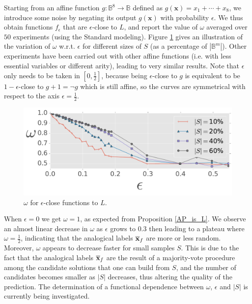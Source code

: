 Starting from an affine function $g \colon \mathbb{B}^8 \to \mathbb{B}$ defined
as  $g(\mathbf{x}) = x_1 + \cdots + x_8$, we introduce some noise by negating
its output $g(\mathbf{x})$ with probability $\epsilon$. We thus obtain
functions $f_{\epsilon}$ that are $\epsilon$-close to $L$, and report the value
of $\omega$ averaged over $50$ experiments (using the Standard modeling).
Figure \ref{omega_vs_eps} gives an illustration of the variation of $\omega$
w.r.t.  $\epsilon$ for different sizes of $S$ (as a percentage of
$|\mathbb{B}^m|$).  Other experiments have been carried out with other affine
functions (i.e.  with less essential variables or different arity), leading to
very similar results.  Note that $\epsilon$ only needs to be taken in $[0,
\frac{1}{2}]$, because being $\epsilon$-close to $g$ is equivalent to be $1 -
\epsilon$-close to $g + 1 = \neg g$ which is still affine, so the curves are
symmetrical with respect to the axis $\epsilon = \frac{1}{2}$.

\begin{figure}
\begin{center}
\includegraphics[scale=0.6]{figures/omega_vs_eps_dim8_nexp50_std_nEss8.pdf}
  \caption{$\omega$ for $\epsilon$-close functions to $L$.}
\label{omega_vs_eps}
\end{center}
\end{figure}

When $\epsilon = 0$ we get $\omega = 1$, as expected from
Proposition \ref{AP_is_L}. We observe an almost linear decrease in $\omega$ as
$\epsilon$ grows to $0.3$ then leading to a plateau where $\omega =
\frac{1}{2}$, indicating that the analogical labels $\overline{\mathbf{x}}_f$ are
more or less random. Moreover, $\omega$ appears to decrease faster for small
samples $S$. This is due to the fact that the analogical labels
$\overline{\mathbf{x}}_f$ are the result of a majority-vote procedure among the
candidate solutions that one can build from $S$, and the number of candidates
becomes smaller as $|S|$ decreases, thus altering the quality of the
prediction. The determination of a functional dependence between $\omega$,
$\epsilon$ and $|S|$ is currently being investigated.

